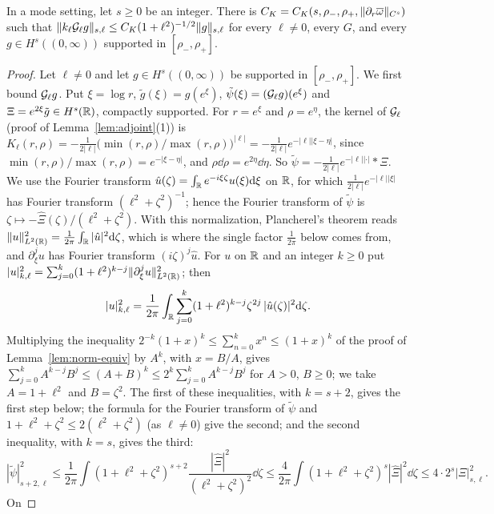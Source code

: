 \begin{corollary}
\label{cor:K-bound}
In a mode setting, let $s\ge0$ be an integer. There is
$C_K=C_K(s,\rho_-,\rho_+,\|\partial_r\overline{\omega}\|_{C^s})$ such that
$\|k_\ell\mathcal{G}_\ell g\|_{s,\ell}\le C_K(1+\ell^2)^{-1/2}\|g\|_{s,\ell}$ for every
$\ell\ne0$, every $G$, and every $g\in H^s((0,\infty))$ supported in
$[\rho_-,\rho_+]$.
\end{corollary}
\begin{proof}
Let $\ell\ne0$ and let $g\in H^s((0,\infty))$ be supported in $[\rho_-,\rho_+]$. We
first bound $\mathcal{G}_\ell g$. Put $\xi=\log r$, $\tilde g(\xi)=g(e^\xi)$, $\tilde\psi(\xi)=(\mathcal{G}_\ell g)(e^\xi)$ and
$\Xi=e^{2\xi}\tilde g\in H^s(\mathbb{R})$, compactly supported. For
$r=e^\xi$ and $\rho=e^\eta$, the kernel of $\mathcal{G}_\ell$ (proof of
Lemma~\ref{lem:adjoint}(1)) is
$K_\ell(r,\rho)=-\frac1{2|\ell|}\big(\min(r,\rho)/\max(r,\rho)\big)^{|\ell|}=-\frac1{2|\ell|}e^{-|\ell||\xi-\eta|}$,
since $\min(r,\rho)/\max(r,\rho)=e^{-|\xi-\eta|}$, and $\rho\dd\rho=e^{2\eta}\dd\eta$. So
$\tilde\psi=-\frac1{2|\ell|}e^{-|\ell||\cdot|}\ast\Xi$. We use the Fourier transform
$\hat u(\zeta)=\int_{\mathbb{R}} e^{-i\xi\zeta}u(\xi)\dd\xi$ on $\mathbb{R}$, for which
$\frac1{2|\ell|}e^{-|\ell||\xi|}$ has Fourier transform $(\ell^2+\zeta^2)^{-1}$; hence
the Fourier transform of $\tilde\psi$ is $\zeta\mapsto-\hat\Xi(\zeta)/(\ell^2+\zeta^2)$.
With this normalization, Plancherel's theorem reads
$\|u\|^2_{L^2(\mathbb{R})}=\frac1{2\pi}\int_{\mathbb{R}}|\hat u|^2\dd\zeta$, which is where the single
factor $\frac1{2\pi}$ below comes from, and $\partial_\xi^ju$ has Fourier transform
$(i\zeta)^j\hat u$. For $u$ on $\mathbb{R}$ and an integer $k\ge0$ put
$|u|_{k,\ell}^2=\sum_{j=0}^{k}(1+\ell^2)^{k-j}\|\partial_\xi^ju\|^2_{L^2(\mathbb{R})}$; then
\[
|u|^2_{k,\ell}=\frac1{2\pi}\int_{\mathbb{R}}\sum_{j=0}^{k}(1+\ell^2)^{k-j}\zeta^{2j}\,|\hat u(\zeta)|^2\dd\zeta .
\]
Multiplying the inequality
$2^{-k}(1+x)^k\le\sum_{n=0}^{k}x^n\le(1+x)^k$ of the proof of Lemma~\ref{lem:norm-equiv}
by $A^k$, with $x=B/A$, gives
$\sum_{j=0}^{k}A^{k-j}B^j\le(A+B)^k\le2^k\sum_{j=0}^{k}A^{k-j}B^j$ for $A>0$, $B\ge0$;
we take $A=1+\ell^2$ and $B=\zeta^2$. The first of these inequalities, with $k=s+2$, gives the
first step below; the formula for the Fourier transform of $\tilde\psi$ and
$1+\ell^2+\zeta^2\le2(\ell^2+\zeta^2)$ (as $\ell\ne0$) give the second; and the second
inequality, with $k=s$, gives the third:
\[
|\tilde\psi|^2_{s+2,\ell}\le\frac1{2\pi}\int(1+\ell^2+\zeta^2)^{s+2}\frac{|\hat\Xi|^2}{(\ell^2+\zeta^2)^2}\dd\zeta
\le\frac4{2\pi}\int(1+\ell^2+\zeta^2)^s|\hat\Xi|^2\dd\zeta\le4\cdot2^s|\Xi|^2_{s,\ell}.
\] On

\end{proof}
